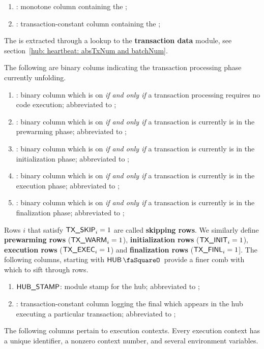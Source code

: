\begin{enumerate}
	\item \absTxNum{}: monotone column containing the \ABSTXNUM{};
	\item \batchNum{}: transaction-constant column containing the \BATCHNUM{};
\end{enumerate}
\saNote{} The \batchNum{} is extracted through a lookup to the \textbf{transaction data} module, see section~\ref{hub: heartbeat: absTxNum and batchNum}.

\noindent The following are binary colums indicating the transaction processing phase currently unfolding.
\begin{enumerate}[resume]
	\item \TXSKIP{}:
		binary column which is on \emph{if and only if} a transaction processing requires no code execution; abbreviated to \txSkip{};
	\item \TXWARM{}:
		binary column which is on \emph{if and only if} a transaction is currently is in the prewarming phase; abbreviated to \txWarm{};
	\item \TXINIT{}:
		binary column which is on \emph{if and only if} a transaction is currently is in the initialization phase; abbreviated to \txInit{};
	\item \TXEXEC{}:
		binary column which is on \emph{if and only if} a transaction is currently is in the execution phase; abbreviated to \txExec{};
	\item \TXFINL{}:
		binary column which is on \emph{if and only if} a transaction is currently is in the finalization phase; abbreviated to \txFinl{};
\end{enumerate}
Rows $i$ that satisfy $\textsf{TX}\textsf{\_SKIP}_{i} = 1$ are called \textbf{skipping rows}. We similarly define
\textbf{prewarming rows} ($\textsf{TX}\textsf{\_WARM}_{i} = 1$),
\textbf{initialization rows} ($\textsf{TX}\textsf{\_INIT}_{i} = 1$),
\textbf{execution rows} ($\textsf{TX}\textsf{\_EXEC}_{i} = 1$) and
\textbf{finalization rows} ($\textsf{TX}\textsf{\_FINL}_{i} = 1$].
The following columns, starting with $\hubStamp$ provide a finer comb with which to sift through rows. 
\begin{enumerate}[resume]
	\item $\textsf{HUB\_STAMP}$: module stamp for the hub; abbreviated to \hubStamp{};
	\item \TXENDSTAMP{}: transaction-constant column logging the final \hubStamp{} which appears in the hub executing a particular transaction; abbreviated to \txEndStamp{};
\end{enumerate}
The following columns pertain to execution contexts. Every execution context has a unique identifier, a nonzero context number, and several environment variables. 
